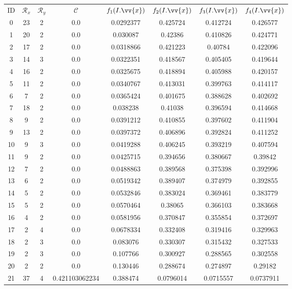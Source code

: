 \scriptsize
\begin{longtable}{|c|c|c|c|c|c|c|c|}
\hline
ID & $\mathscr{R}_x$ & $\mathscr{R}_y$ & $\mathscr{C}$ & $f_1(I.\vv{x})$ & $f_2(I.\vv{x})$ & $f_3(I.\vv{x})$ & $f_4(I.\vv{x})$ \\
0 & 23 & 2 & 0.0 & 0.0292377 & 0.425724 & 0.412724 & 0.426577 \\
1 & 20 & 2 & 0.0 & 0.030087 & 0.42386 & 0.410826 & 0.424771 \\
2 & 17 & 2 & 0.0 & 0.0318866 & 0.421223 & 0.40784 & 0.422096 \\
3 & 14 & 3 & 0.0 & 0.0322351 & 0.418567 & 0.405405 & 0.419644 \\
4 & 16 & 2 & 0.0 & 0.0325675 & 0.418894 & 0.405988 & 0.420157 \\
5 & 11 & 2 & 0.0 & 0.0340767 & 0.413031 & 0.399763 & 0.414117 \\
6 & 7 & 2 & 0.0 & 0.0365424 & 0.401675 & 0.388628 & 0.402692 \\
7 & 18 & 2 & 0.0 & 0.038238 & 0.41038 & 0.396594 & 0.414668 \\
8 & 9 & 2 & 0.0 & 0.0391212 & 0.410855 & 0.397602 & 0.411904 \\
9 & 13 & 2 & 0.0 & 0.0397372 & 0.406896 & 0.392824 & 0.411252 \\
10 & 9 & 3 & 0.0 & 0.0419288 & 0.406245 & 0.393219 & 0.407594 \\
11 & 9 & 2 & 0.0 & 0.0425715 & 0.394656 & 0.380667 & 0.39842 \\
12 & 7 & 2 & 0.0 & 0.0488863 & 0.389568 & 0.375398 & 0.392996 \\
13 & 6 & 2 & 0.0 & 0.0519342 & 0.389407 & 0.374979 & 0.392855 \\
14 & 5 & 2 & 0.0 & 0.0532846 & 0.383024 & 0.369461 & 0.383779 \\
15 & 5 & 2 & 0.0 & 0.0570464 & 0.38065 & 0.366103 & 0.383668 \\
16 & 4 & 2 & 0.0 & 0.0581956 & 0.370847 & 0.355854 & 0.372697 \\
17 & 2 & 4 & 0.0 & 0.0678334 & 0.332408 & 0.319416 & 0.329963 \\
18 & 2 & 3 & 0.0 & 0.083076 & 0.330307 & 0.315432 & 0.327533 \\
19 & 2 & 3 & 0.0 & 0.107766 & 0.300927 & 0.288565 & 0.302558 \\
20 & 2 & 2 & 0.0 & 0.130446 & 0.288674 & 0.274897 & 0.29182 \\
21 & 37 & 4 & 0.421103062234 & 0.388474 & 0.0796014 & 0.0715557 & 0.0737911 \\

\end{longtable}
